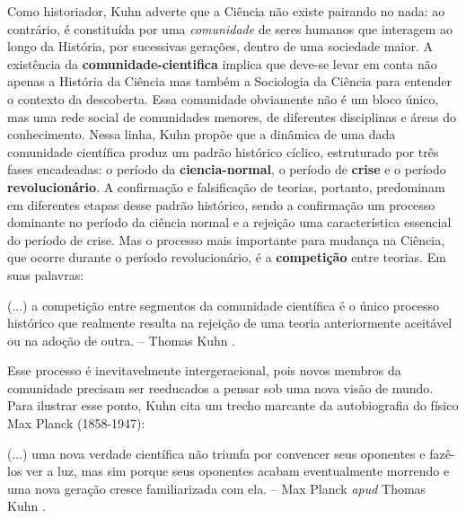 \documentclass[./main.tex]{subfiles}
\begin{document}
\par Como historiador, Kuhn adverte que a Ciência não existe pairando no nada: ao contrário, é constituída por uma \textit{comunidade} de seres humanos que interagem ao longo da História, por sucessivas gerações, dentro de uma sociedade maior. A existência da \textbf{\gls{comunidade-cientifica}} implica que deve-se levar em conta não apenas a História da Ciência mas também a Sociologia da Ciência para entender o contexto da descoberta. Essa comunidade obviamente não é um bloco único, mas uma rede social de comunidades menores, de diferentes disciplinas e áreas do conhecimento. Nessa linha, Kuhn propõe que a dinâmica de uma dada comunidade científica produz um padrão histórico cíclico, estruturado por três fases encadeadas: o período da \textbf{\gls{ciencia-normal}}, o período de \textbf{crise} e o período \textbf{revolucionário}. A confirmação e falsificação de teorias, portanto, predominam em diferentes etapas desse padrão histórico, sendo a confirmação um processo dominante no período da ciência normal e a rejeição uma característica essencial do período de crise. Mas o processo mais importante para mudança na Ciência, que ocorre durante o período revolucionário, é a \textbf{competição} entre teorias. Em suas palavras:

\begin{adjustwidth}{100pt}{0pt}
\medskip
\small (...) a competição entre segmentos da comunidade científica é o único processo histórico que realmente resulta na rejeição de uma teoria anteriormente aceitável ou na adoção de outra. -- Thomas Kuhn \cite{kuhn2012structure}.
\medskip
\end{adjustwidth}

\noindent Esse processo é inevitavelmente intergeracional, pois novos membros da comunidade precisam ser reeducados a pensar sob uma nova visão de mundo. Para ilustrar esse ponto, Kuhn cita um trecho marcante da autobiografia do físico Max Planck (1858-1947):

\begin{adjustwidth}{100pt}{0pt}
\medskip
\small (...) uma nova verdade científica não triunfa por convencer seus oponentes e fazê-los ver a luz, mas sim porque seus oponentes acabam eventualmente morrendo e uma nova geração cresce familiarizada com ela. -- Max Planck \textit{apud} Thomas Kuhn \cite{kuhn2012structure}.
\medskip
\end{adjustwidth}
\end{document}
